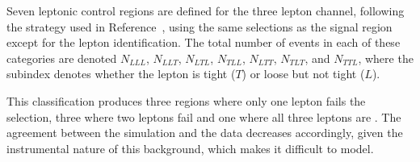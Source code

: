 \label{sec:lepCR3l}


Seven leptonic control regions are defined for the three lepton channel, following the strategy used in Reference~\cite{CMS-SMP-20-014},
using the same selections as the signal region except for the lepton identification.
The total number of events in each of these categories are denoted
$N_{LLL}$, $N_{LLT}$, $N_{LTL}$, $N_{TLL}$, $N_{LTT}$, $N_{TLT}$, and $N_{TTL}$, where the subindex denotes whether the lepton is tight ($T$) or loose but not tight ($L$).

This classification produces three regions where only one lepton fails the selection, three where two leptons fail and one where all three leptons are \nonprompt.
The agreement between the simulation and the data decreases accordingly, given the instrumental nature of this background, which makes it difficult to model.

